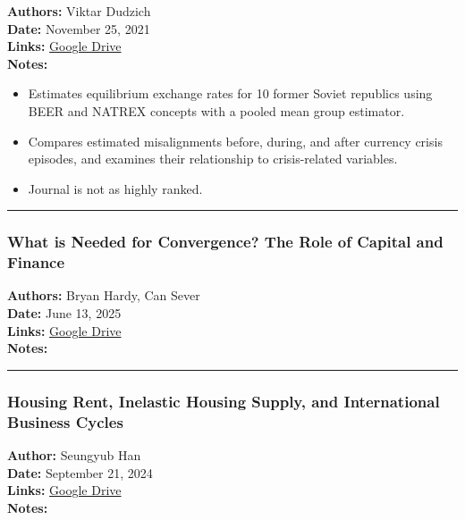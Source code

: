 \documentclass[
  11pt,
]{article}
\providecommand{\tightlist}{%
  \setlength{\itemsep}{0pt}\setlength{\parskip}{0pt}}
\begin{document}
\textbf{Authors:} Viktar Dudzich\\
\textbf{Date:} November 25, 2021\\
\textbf{Links:}
\href{https://drive.google.com/file/d/1O9A9N2GmYd0LRPhnE3LdUbVbDA0hd6zk/view?usp=sharing}{Google
Drive}\\
\textbf{Notes:}

\begin{itemize}
\tightlist
\item
  Estimates equilibrium exchange rates for 10 former Soviet republics
  using BEER and NATREX concepts with a pooled mean group estimator.
\item
  Compares estimated misalignments before, during, and after currency
  crisis episodes, and examines their relationship to crisis-related
  variables.
\item
  Journal is not as highly ranked.
\end{itemize}

\begin{center}\rule{0.5\linewidth}{0.5pt}\end{center}

\subsubsection{What is Needed for Convergence? The Role of Capital and
Finance}\label{what-is-needed-for-convergence-the-role-of-capital-and-finance}

\textbf{Authors:} Bryan Hardy, Can Sever\\
\textbf{Date:} June 13, 2025\\
\textbf{Links:}
\href{https://drive.google.com/file/d/1UEEN58-yuPErOCtVsMKjYnqeX62k0BU4/view?usp=sharing}{Google
Drive}\\
\textbf{Notes:}

\begin{center}\rule{0.5\linewidth}{0.5pt}\end{center}

\subsubsection{Housing Rent, Inelastic Housing Supply, and International
Business
Cycles}\label{housing-rent-inelastic-housing-supply-and-international-business-cycles}

\textbf{Author:} Seungyub Han\\
\textbf{Date:} September 21, 2024\\
\textbf{Links:}
\href{https://drive.google.com/file/d/1loPvpeqirt1pulEqajxQNMCGLeIFt_AS/view?usp=sharing}{Google
Drive}\\
\textbf{Notes:}
\end{document}
